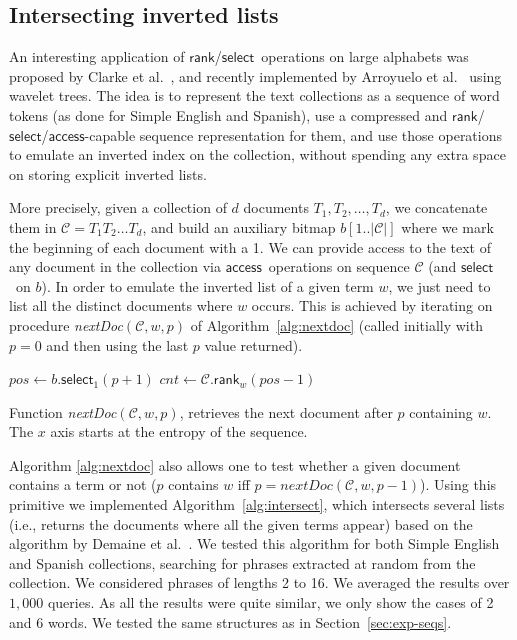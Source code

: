 \documentclass[11pt]{article}
\newcommand{\access}
    {\ensuremath{\mathsf{access}}}
\newcommand{\rank}
    {\ensuremath{\mathsf{rank}}}
\newcommand{\select}
    {\ensuremath{\mathsf{select}}}
\newcommand{\Cs}{\mathcal{C}}
\begin{document}
\subsection{Intersecting inverted lists}
\label{sec:exp-invl}

An interesting application of \rank/\select\ operations on large alphabets
was proposed by Clarke et al.~\cite{CCT00}, and recently implemented by
Arroyuelo et al.~\cite{AGO10} using wavelet trees. The idea is to represent
the text collections as a sequence of word tokens (as done for Simple English
and Spanish), use a compressed and \rank/\select/\access-capable sequence 
representation for them, and use those operations to emulate an inverted index 
on the collection, without spending any extra space on storing explicit 
inverted lists. 

More precisely, given a collection of $d$ documents $T_1,T_2,\ldots,T_d$, we
concatenate them in $\mathcal{C} = T_1 T_2 \ldots T_d$, and build
an auxiliary bitmap $b[1..|\mathcal{C}|]$ where we mark the
beginning of each document with a 1. We can provide access to the text of any
document in the collection via \access\ operations on sequence
$\mathcal{C}$ (and \select\ on $b$). In order to emulate the inverted list of 
a given term $w$, we just need to list all the distinct documents where $w$ 
occurs. This is achieved by iterating on procedure 
{\em nextDoc}$(\Cs,w,p)$ of Algorithm~\ref{alg:nextdoc} (called initially with 
$p=0$ and then using the last $p$ value returned).

\begin{algorithm}[htb]

$pos \leftarrow b.\select_1(p+1)$\;
$cnt \leftarrow \Cs.\rank_w(pos-1)$\;
\Return{$b.\rank_1(\Cs.\select_w(cnt+1))$}
\caption{Function {\em nextDoc}$(\Cs, w, p)$, retrieves the next document 
after $p$ containing $w$. The $x$ axis starts at the entropy of the sequence.}
\label{alg:nextdoc}
\end{algorithm}

Algorithm \ref{alg:nextdoc} also allows one to test whether a given document 
contains a term or not ($p$ contains $w$ iff $p=\mathit{nextDoc}(\Cs,w,p-1)$). 
Using this primitive we implemented Algorithm~\ref{alg:intersect}, which
intersects several lists (i.e., returns the documents where all the given
terms appear) based on the algorithm by Demaine et al.~\cite{DLM00}. We
tested this algorithm for both Simple English and Spanish collections,
searching for phrases extracted at random from the collection. We considered 
phrases of lengths 2 to 16. We averaged the results over $1{,}000$ queries. As all 
the results were quite similar, we only show the cases of 2 and 6 words.
We tested the same structures as in Section~\ref{sec:exp-seqs}.
\end{document}
